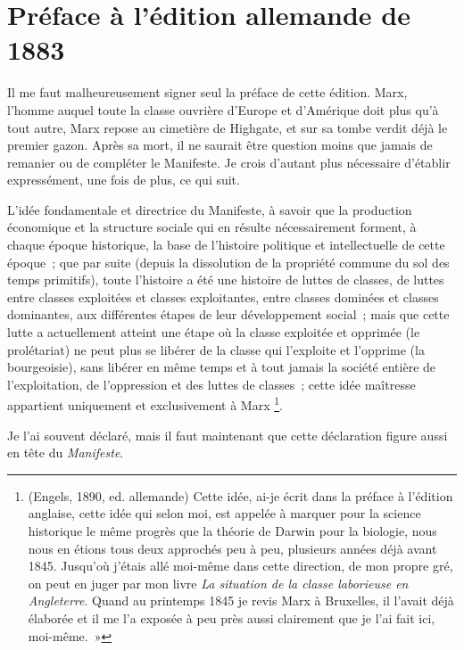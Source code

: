 \documentclass[french,twoside]{book} %
\newcommand{\byline}[1]{\bigskip{\RaggedLeft{#1}\par}\bigskip}
\begin{document}
\section[{Préface à l’édition allemande de 1883}]{Préface à l’édition allemande de 1883}
\noindent Il me faut malheureusement signer seul la préface de cette édition. Marx, l’homme auquel toute la classe ouvrière d’Europe et d’Amérique doit plus qu’à tout autre, Marx repose au cimetière de Highgate, et sur sa tombe verdit déjà le premier gazon. Après sa mort, il ne saurait être question moins que jamais de remanier ou de compléter le Manifeste. Je crois d’autant plus nécessaire d’établir expressément, une fois de plus, ce qui suit.\par
L'idée fondamentale et directrice du Manifeste, à savoir que la production économique et la structure sociale qui en résulte nécessairement forment, à chaque époque historique, la base de l’histoire politique et intellectuelle de cette époque ; que par suite (depuis la dissolution de la propriété commune du sol des temps primitifs), toute l’histoire a été une histoire de luttes de classes, de luttes entre classes exploitées et classes exploitantes, entre classes dominées et classes dominantes, aux différentes étapes de leur développement social ; mais que cette lutte a actuellement atteint une étape où la classe exploitée et opprimée (le prolétariat) ne peut plus se libérer de la classe qui l’exploite et l’opprime (la bourgeoisie), sans libérer en même temps et à tout jamais la société entière de l’exploitation, de l’oppression et des luttes de classes ; cette idée maîtresse appartient uniquement et exclusivement à Marx \footnote{ \noindent (Engels, 1890, ed. allemande) Cette idée, ai-je écrit dans la préface à l’édition anglaise, cette idée qui selon moi, est appelée à marquer pour la science historique le même progrès que la théorie de Darwin pour la biologie, nous nous en étions tous deux approchés peu à peu, plusieurs années déjà avant 1845. Jusqu’où j’étais allé moi-même dans cette direction, de mon propre gré, on peut en juger par mon livre \emph{La situation de la classe laborieuse en Angleterre}. Quand au printemps 1845 je revis Marx à Bruxelles, il l’avait déjà élaborée et il me l’a exposée à peu près aussi clairement que je l’ai fait ici, moi-même. »
 }.\par
Je l’ai souvent déclaré, mais il faut maintenant que cette déclaration figure aussi en tête du \emph{Manifeste}.\par

\byline{Friedrich Engels ; \\
Londres, 28 juin 1883}
\end{document}
